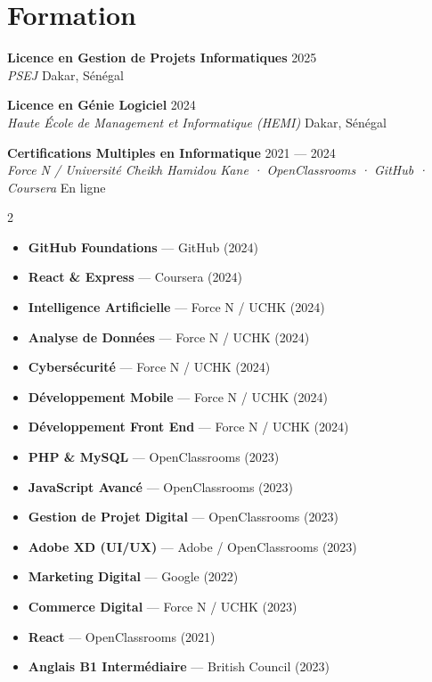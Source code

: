 \documentclass[a4paper,11pt]{article}
\newcommand{\cventry}[4]{
    {\textbf{\color{darktext}#1}} \hfill {\small\color{graytext}#2} \\
    {\color{accent}\textit{#3}} \hfill {\small\color{graytext}#4}
}
\begin{document}
\section{ Formation}

\cventry{Licence en Gestion de Projets Informatiques}{2025}{PSEJ}{Dakar, Sénégal}

\vspace{4pt}

\cventry{Licence en Génie Logiciel}{2024}{Haute École de Management et Informatique (HEMI)}{Dakar, Sénégal}

\vspace{4pt}

\cventry{Certifications Multiples en Informatique}{2021 — 2024}{Force N / Université Cheikh Hamidou Kane · OpenClassrooms · GitHub · Coursera}{En ligne}

\vspace{4pt}

\begin{multicols}{2}
\begin{itemize}[leftmargin=12pt, itemsep=1pt, topsep=2pt]
    \item \textbf{GitHub Foundations} — GitHub (2024)
    \item \textbf{React \& Express} — Coursera (2024)
    \item \textbf{Intelligence Artificielle} — Force N / UCHK (2024)
    \item \textbf{Analyse de Données} — Force N / UCHK (2024)
    \item \textbf{Cybersécurité} — Force N / UCHK (2024)
    \item \textbf{Développement Mobile} — Force N / UCHK (2024)
    \item \textbf{Développement Front End} — Force N / UCHK (2024)
    \item \textbf{PHP \& MySQL} — OpenClassrooms (2023)
    \item \textbf{JavaScript Avancé} — OpenClassrooms (2023)
    \item \textbf{Gestion de Projet Digital} — OpenClassrooms (2023)
    \item \textbf{Adobe XD (UI/UX)} — Adobe / OpenClassrooms (2023)
    \item \textbf{Marketing Digital} — Google (2022)
    \item \textbf{Commerce Digital} — Force N / UCHK (2023)
    \item \textbf{React} — OpenClassrooms (2021)
    \item \textbf{Anglais B1 Intermédiaire} — British Council (2023)
\end{itemize}
\end{multicols}
\end{document}
